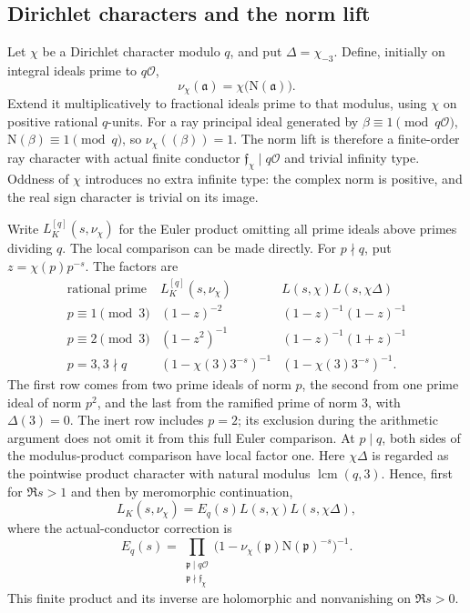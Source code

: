 \documentclass[11pt]{article}
\numberwithin{equation}{section}
\theoremstyle{definition}
\theoremstyle{remark}
\newcommand{\OO}{\mathcal O}
\newcommand{\N}{\mathrm N}
\begin{document}
\subsection{Dirichlet characters and the norm lift}

Let \(\chi\) be a Dirichlet character modulo \(q\), and put
\(\Delta=\chi_{-3}\). Define, initially on integral ideals prime
to \(q\OO\),
\[
 \nu_\chi(\mathfrak a)=\chi\bigl(\N(\mathfrak a)\bigr).
\]
Extend it multiplicatively to fractional ideals prime to that modulus,
using \(\chi\) on positive rational \(q\)-units. For a ray principal
ideal generated by \(\beta\equiv1\pmod{q\OO}\),
\(\N(\beta)\equiv1\pmod q\), so \(\nu_\chi((\beta))=1\).
The norm lift is therefore a finite-order ray character with actual
finite conductor \(\mathfrak f_\chi\mid q\OO\) and trivial infinity
type. Oddness of \(\chi\) introduces no extra infinite type: the
complex norm is positive, and the real sign character is trivial on
its image.

Write \(L_K^{[q]}(s,\nu_\chi)\) for the Euler product omitting all
prime ideals above primes dividing \(q\). The local comparison can
be made directly. For \(p\nmid q\), put \(z=\chi(p)p^{-s}\).
The factors are
\[
\begin{array}{c|c|c}
 \text{rational prime} & L_K^{[q]}(s,\nu_\chi)
                        & L(s,\chi)L(s,\chi\Delta)\\ \hline
 p\equiv1\pmod3 &(1-z)^{-2}&(1-z)^{-1}(1-z)^{-1}\\
 p\equiv2\pmod3 &(1-z^2)^{-1}&(1-z)^{-1}(1+z)^{-1}\\
 p=3, 3\nmid q &(1-\chi(3)3^{-s})^{-1}
                    &(1-\chi(3)3^{-s})^{-1}.
\end{array}
\]
The first row comes from two prime ideals of norm \(p\), the second
from one prime ideal of norm \(p^2\), and the last from the ramified
prime of norm 3, with \(\Delta(3)=0\). The inert row includes
\(p=2\); its exclusion during the arithmetic argument does not omit
it from this full Euler comparison. At \(p\mid q\), both sides of
the modulus-product comparison have local factor one. Here
\(\chi\Delta\) is regarded as the pointwise product character with
natural modulus \(\operatorname{lcm}(q,3)\). Hence, first for
\(\Re s>1\) and then by meromorphic continuation,
\begin{equation}\label{eq:final-normlift}
 L_K(s,\nu_\chi)=E_q(s)L(s,\chi)L(s,\chi\Delta),
\end{equation}
where the actual-conductor correction is
\[
 E_q(s)=\prod_{\substack{\mathfrak p\mid q\OO\\
                         \mathfrak p\nmid\mathfrak f_\chi}}
       \bigl(1-\nu_\chi(\mathfrak p)\N(\mathfrak p)^{-s}\bigr)^{-1}.
\]
This finite product and its inverse are holomorphic and nonvanishing
on \(\Re s>0\).
\end{document}
